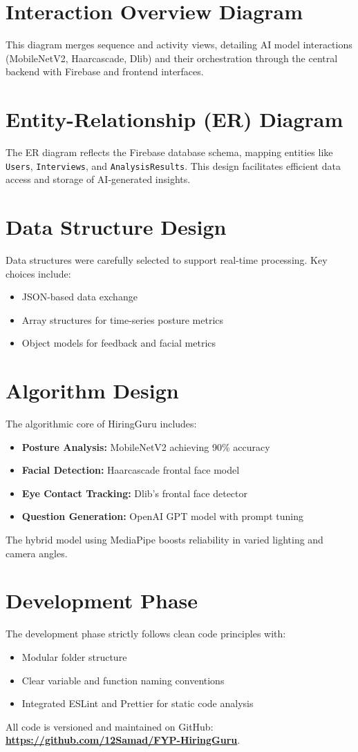 \section{Interaction Overview Diagram}
This diagram merges sequence and activity views, detailing AI model interactions (MobileNetV2, Haarcascade, Dlib) and their orchestration through the central backend with Firebase and frontend interfaces.

\section{Entity-Relationship (ER) Diagram}
The ER diagram reflects the Firebase database schema, mapping entities like \texttt{Users}, \texttt{Interviews}, and \texttt{AnalysisResults}. This design facilitates efficient data access and storage of AI-generated insights.

\section{Data Structure Design}
Data structures were carefully selected to support real-time processing. Key choices include:
\begin{itemize}
    \item JSON-based data exchange
    \item Array structures for time-series posture metrics
    \item Object models for feedback and facial metrics
\end{itemize}

\section{Algorithm Design}
The algorithmic core of HiringGuru includes:
\begin{itemize}
    \item \textbf{Posture Analysis:} MobileNetV2 achieving 90\% accuracy
    \item \textbf{Facial Detection:} Haarcascade frontal face model
    \item \textbf{Eye Contact Tracking:} Dlib’s frontal face detector
    \item \textbf{Question Generation:} OpenAI GPT model with prompt tuning
\end{itemize}
The hybrid model using MediaPipe boosts reliability in varied lighting and camera angles.

\section{Development Phase}
The development phase strictly follows clean code principles with:
\begin{itemize}
    \item Modular folder structure
    \item Clear variable and function naming conventions
    \item Integrated ESLint and Prettier for static code analysis
\end{itemize}
All code is versioned and maintained on GitHub: \textbf{\url{https://github.com/12Samad/FYP-HiringGuru}}.

